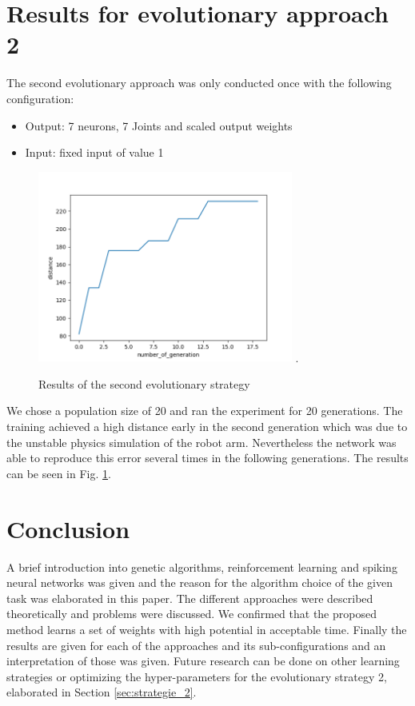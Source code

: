 \section{Results for evolutionary approach 2}
The second evolutionary approach was only conducted once with the following configuration:
\begin{itemize}
	\item Output: 7 neurons, 7 Joints and scaled output weights 
	\item Input: fixed input of value 1
\end{itemize}
\begin{figure}[H]
	\centering
	\includegraphics[width=3.3in]{img/approach2.png}
	\DeclareGraphicsExtensions.
	\caption{Results of the second evolutionary strategy}
	\label{fig:results_2}
\end{figure}
We chose a population size of 20 and ran the experiment for 20 generations. The training achieved a high distance early in the second generation which was due to the unstable physics simulation of the robot arm. Nevertheless the network was able to reproduce this error several times in the following generations. The results can be seen in Fig. \ref{fig:results_2}.

\section{Conclusion}
A brief introduction into genetic algorithms, reinforcement learning and spiking neural networks was given and the reason for the algorithm choice of the given task was elaborated in this paper. The different approaches were described theoretically and problems were discussed. We confirmed that the proposed method learns a set of weights with high potential in acceptable time. Finally the results are given for each of the approaches and its sub-configurations and an interpretation of those was given.
Future research can be done on other learning strategies or optimizing the hyper-parameters for the evolutionary strategy 2, elaborated in Section \ref{sec:strategie_2}.